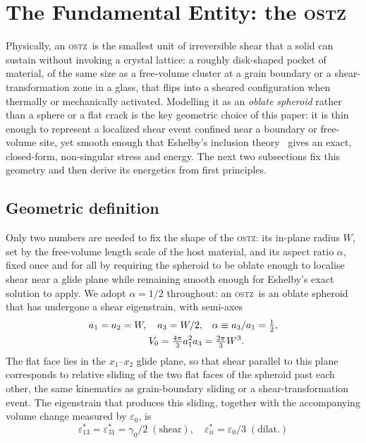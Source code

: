 \documentclass[5p,sort&compress]{elsarticle}
\newcommand{\OSTZ}{\textsc{ostz}}
\newcommand{\gz}{\gamma_0}
\begin{document}
\section{The Fundamental Entity: the \OSTZ}
\label{sec:ostz}

Physically, an \OSTZ\ is the smallest unit of irreversible shear
that a solid can sustain without invoking a crystal lattice: a
roughly disk-shaped pocket of material, of the same size as a
free-volume cluster at a grain boundary or a shear-transformation
zone in a glass, that flips into a sheared configuration when
thermally or mechanically activated. Modelling it as an
\emph{oblate spheroid} rather than a sphere or a flat crack is the
key geometric choice of this paper: it is thin enough to represent a
localized shear event confined near a boundary or free-volume site,
yet smooth enough that Eshelby's inclusion theory~\cite{eshelby1957}
gives an exact, closed-form, non-singular stress and energy. The
next two subsections fix this geometry and then derive its
energetics from first principles.

\subsection{Geometric definition}
\label{sec:geometry}

Only two numbers are needed to fix the shape of the \OSTZ: its
in-plane radius $W$, set by the free-volume length scale of the
host material, and its aspect ratio $\alpha$, fixed once and for all
by requiring the spheroid to be oblate enough to localise shear near
a glide plane while remaining smooth enough for Eshelby's exact
solution to apply. We adopt $\alpha=1/2$ throughout: an \OSTZ\ is an
oblate spheroid that has undergone a shear eigenstrain, with
semi-axes
\begin{align}
  a_1=a_2=W,\quad a_3=W/2,&\quad \alpha\equiv a_3/a_1=\tfrac{1}{2},
  \notag\\
  V_0=\tfrac{4\pi}{3}a_1^2 a_3&=\tfrac{2\pi}{3}W^3.
  \label{eq:geometry}
\end{align}
The flat face lies in the $x_1$--$x_2$ glide plane, so that shear
parallel to this plane corresponds to relative sliding of the two
flat faces of the spheroid past each other, the same kinematics
as grain-boundary sliding or a shear-transformation event. The
eigenstrain that produces this sliding, together with the
accompanying volume change measured by $\varepsilon_0$, is
\begin{equation}
  \varepsilon^*_{13}=\varepsilon^*_{31}=\gz/2\;(\text{shear}),\quad
  \varepsilon^*_{ii}=\varepsilon_0/3\;(\text{dilat.})
  \label{eq:eigenstrain}
\end{equation}
\end{document}

